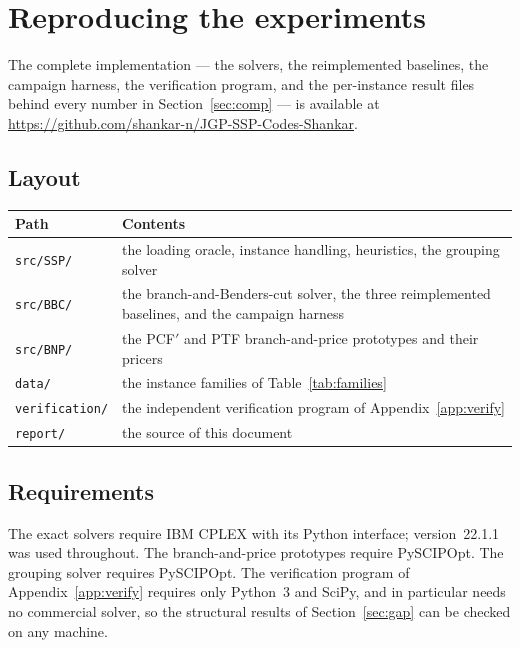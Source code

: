 \section{Reproducing the experiments}\label{app:repro}

The complete implementation --- the solvers, the reimplemented baselines, the campaign
harness, the verification program, and the per-instance result files behind every
number in Section~\ref{sec:comp} --- is available at
\url{https://github.com/shankar-n/JGP-SSP-Codes-Shankar}.

\subsection{Layout}\label{ssec:repro-layout}

\noindent\begin{tabular}{@{}l>{\raggedright\arraybackslash}p{9.4cm}@{}}
\toprule
Path & Contents \\
\midrule
\texttt{src/SSP/}     & the loading oracle, instance handling, heuristics, the grouping solver \\
\texttt{src/BBC/}     & the branch-and-Benders-cut solver, the three reimplemented baselines, and the campaign harness \\
\texttt{src/BNP/}     & the PCF$'$ and PTF branch-and-price prototypes and their pricers \\
\texttt{data/}        & the instance families of Table~\ref{tab:families} \\
\texttt{verification/}& the independent verification program of Appendix~\ref{app:verify} \\
\texttt{report/}      & the source of this document \\
\bottomrule
\end{tabular}

\subsection{Requirements}\label{ssec:repro-req}

The exact solvers require IBM CPLEX with its Python interface; version~22.1.1 was used
throughout. The branch-and-price prototypes require PySCIPOpt. The grouping solver
requires PySCIPOpt. The verification program of Appendix~\ref{app:verify} requires
only Python~3 and SciPy, and in particular needs no commercial solver, so the
structural results of Section~\ref{sec:gap} can be checked on any machine.

